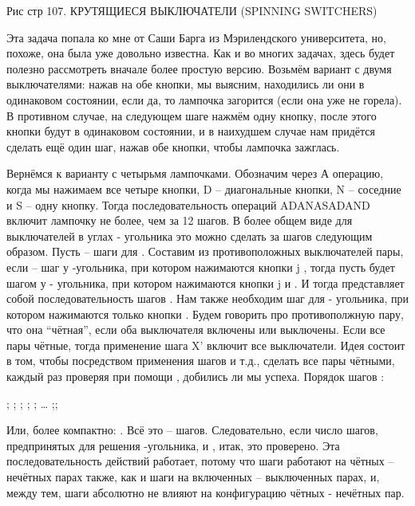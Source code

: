                                     Рис стр 107.
КРУТЯЩИЕСЯ ВЫКЛЮЧАТЕЛИ (SPINNING SWITCHERS)


  Эта задача попала ко мне от Саши Барга из Мэрилендского университета, но, похоже, она была уже довольно известна. Как и во многих задачах, здесь будет полезно рассмотреть вначале  более простую версию. Возьмём вариант с двумя выключателями: нажав на обе кнопки, мы выясним, находились ли они в одинаковом состоянии, если да, то лампочка загорится (если она уже не горела).
В противном случае, на следующем шаге нажмём одну кнопку, после этого кнопки будут в одинаковом состоянии, и в наихудшем случае нам придётся сделать ещё один шаг, нажав обе кнопки, чтобы лампочка зажглась.
  
  Вернёмся к варианту с четырьмя лампочками. Обозначим через А операцию, когда мы нажимаем все четыре кнопки, D -- диагональные кнопки, N -- соседние и 
S -- одну кнопку. Тогда последовательность операций ADANASADAND включит лампочку не более, чем за 12 шагов.
  В более общем виде для выключателей в углах - угольника это можно   сделать за шагов следующим образом. Пусть  -- шаги для . Составим из противоположных  выключателей  пары, если -- шаг у -угольника, при котором нажимаются кнопки j , тогда пусть будет шагом у - угольника, при котором нажимаются кнопки  j  и . И тогда  представляет собой последовательность шагов .
  Нам также необходим шаг  для - угольника, при котором нажимаются только кнопки .
  Будем говорить про противополжную пару, что она “чётная”, если оба выключателя включены или выключены. Если все пары чётные, тогда применение шага X’ включит все выключатели. Идея состоит в том, чтобы посредством применения  шагов и т.д.,  сделать все пары чётными, каждый раз проверяя при помощи , добились  ли мы успеха. Порядок шагов :
 
;  ; ; ;
; … ;; 


Или, более компактно: . Всё это --
шагов. Следовательно, если  число шагов, предпринятых для решения -угольника,  и
, итак, это проверено.
  Эта последовательность действий работает, потому что шаги работают на чётных -- нечётных  парах также, как и шаги на включенных -- выключенных парах, и, между тем, шаги абсолютно не влияют на конфигурацию чётных - нечётных пар.


